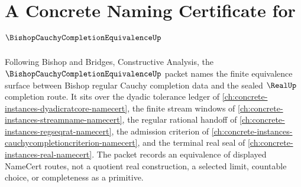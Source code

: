\chapter{A Concrete Naming Certificate for $\BishopCauchyCompletionEquivalenceUp$}
\label{ch:concrete-instances-bishop-cauchy-completion-equivalence-namecert}

Following Bishop and Bridges, Constructive Analysis, the $\BishopCauchyCompletionEquivalenceUp$ packet names the finite equivalence surface between Bishop regular Cauchy completion data and the sealed $\RealUp$ completion route. It sits over the dyadic tolerance ledger of \autoref{ch:concrete-instances-dyadicratcore-namecert}, the finite stream windows of \autoref{ch:concrete-instances-streamname-namecert}, the regular rational handoff of \autoref{ch:concrete-instances-regseqrat-namecert}, the admission criterion of \autoref{ch:concrete-instances-cauchycompletioncriterion-namecert}, and the terminal real seal of \autoref{ch:concrete-instances-real-namecert}. The packet records an equivalence of displayed NameCert routes, not a quotient real construction, a selected limit, countable choice, or completeness as a primitive.

